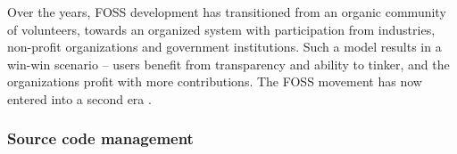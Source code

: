 
Over the years, FOSS development has transitioned from an organic community of
volunteers, towards an organized system with participation from industries,
non-profit organizations and government institutions.
%
Such a model results in a win-win scenario -- users benefit from transparency and
ability to tinker, and the organizations profit with more contributions.
%
The FOSS movement has now entered into a second era
\citep{fitzgerald_transformation_2006}.









\subsubsection{Source code management}

